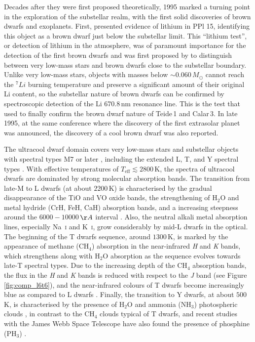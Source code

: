 Decades after they were first proposed theoretically, 1995 marked a turning point in the exploration of the substellar realm, with the first solid discoveries of brown dwarfs and exoplanets. First, \citet{basri1995} presented evidence of lithium in PPl 15, identifying this object as a brown dwarf just below the substellar limit. This ``lithium test'', or detection of lithium in the atmosphere, was of paramount importance for the detection of the first brown dwarfs and was first proposed by \citet{Rebolo1992} to distinguish between very low-mass stars and brown dwarfs close to the substellar boundary. Unlike very low-mass stars, objects with masses below $\sim0.060$\,$M_{\odot}$ \citep[see Figure 2 in][]{chabrier2000} cannot reach the $^{7}Li$ burning temperature and preserve a significant amount of their original Li content, so the substellar nature of brown dwarfs can be confirmed by spectroscopic detection of the Li 670.8\,nm resonance line. This is the test that \citet{rebolo1996} used to finally confirm the brown dwarf nature of Teide\,1 and Calar\,3. In late 1995, at the same conference where the discovery of the first extrasolar planet was announced, the discovery of a cool brown dwarf \citep[GJ\,229B; ][]{nakajima1995,oppenheimer1995} was also reported.

The ultracool dwarf domain covers very low-mass stars and substellar objects with spectral types M7 or later \citep{kirkpatrick1997}, including the extended L, T, and Y spectral types \citep{martin1997,martin1999b,kirkpatrick1999,burgasser2006,geballe2002,burningham2008,cushing2011}. With effective temperatures of $T_{\mathrm{eff}}\lesssim2800$\,K, the spectra of ultracool dwarfs are dominated by strong molecular absorption bands. The transition from late-M to L dwarfs (at about $2200$\,K) is characterised by the gradual disappearance of the TiO and VO oxide bands, the strengthening of H$_2$O and metal hydride (CrH, FeH, CaH) absorption bands, and a increasing steepness around the $6000-10000$\,$\AA$ interval \citep{kirkpatrick2000,reid2000,geballe2002}. Also, the neutral alkali metal absorption lines, especially Na~{\textsc{i}} and K~{\textsc{i}}, grow considerably by mid-L dwarfs in the optical. The beginning of the T dwarfs sequence, around $1300$\,K, is marked by the appearance of methane (CH$_4$) absorption in the near-infrared \textit{H} and \textit{K} bands, which strengthens along with H$_2$O absorption as the sequence evolves towards late-T spectral types. Due to the increasing depth of the CH$_4$ absorption bands, the flux in the \textit{H} and \textit{K} bands is reduced with respect to the \textit{J} band (see Figure \ref{fig:comp_l6t6}), and the near-infrared colours of T dwarfs become increasingly blue as compared to L dwarfs \citep{burgasser2002,geballe2002}. Finally, the transition to Y dwarfs, at about $500$\,K, is characterised by the presence of H$_2$O and ammonia (NH$_3$) photospheric clouds \citep{delorme2008,cushing2011}, in contrast to the CH$_4$ clouds typical of T dwarfs, and recent studies with the James Webb Space Telescope \citep[JWST,][]{jwst} have also found the presence of phosphine (PH$_3$) \citep{burgasser2024}.



